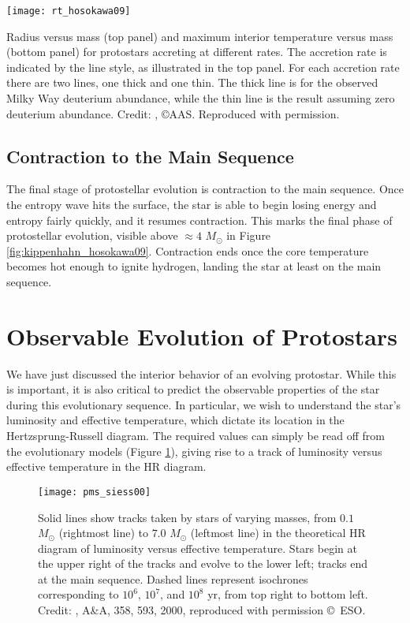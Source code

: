 \begin{marginfigure}
\texttt{[image: rt\_hosokawa09]}
\caption[Protostellar mass-radius relation for different accretion rates]{
\label{fig:rt_hosokawa09}
Radius versus mass (top panel) and maximum interior temperature versus mass (bottom panel) for protostars accreting at different rates. The accretion rate is indicated by the line style, as illustrated in the top panel. For each accretion rate there are two lines, one thick and one thin. The thick line is for the observed Milky Way deuterium abundance, while the thin line is the result assuming zero deuterium abundance.  Credit: \citet{hosokawa09a}, \copyright AAS. Reproduced with permission.
}
\end{marginfigure}

\subsection{Contraction to the Main Sequence}

The final stage of protostellar evolution is contraction to the main sequence. Once the entropy wave hits the surface, the star is able to begin losing energy and entropy fairly quickly, and it resumes contraction. This marks the final phase of protostellar evolution, visible above $\approx 4$ $M_\odot$ in Figure \ref{fig:kippenhahn_hosokawa09}. Contraction ends once the core temperature becomes hot enough to ignite hydrogen, landing the star at least on the main sequence.

\section{Observable Evolution of Protostars}


We have just discussed the interior behavior of an evolving protostar. While this is important, it is also critical to predict the observable properties of the star during this evolutionary sequence. In particular, we wish to understand the star's luminosity and effective temperature, which dictate its location in the Hertzsprung-Russell diagram. The required values can simply be read off from the evolutionary models (Figure \ref{fig:pms_siess00}), giving rise to a track of luminosity versus effective temperature in the HR diagram.

\begin{figure}
\texttt{[image: pms\_siess00]}
\caption[Pre-main sequence evolutionary tracks]{
\label{fig:pms_siess00}
Solid lines show tracks taken by stars of varying masses, from $0.1$ $M_\odot$ (rightmost line) to $7.0$ $M_\odot$ (leftmost line) in the theoretical HR diagram of luminosity versus effective temperature. Stars begin at the upper right of the tracks and evolve to the lower left; tracks end at the main sequence. Dashed lines represent isochrones corresponding to $10^6$, $10^7$, and $10^8$ yr, from top right to bottom left. Credit: \citeauthor{siess00a}, A\&A, 358, 593, 2000, reproduced
with permission \copyright\, ESO.
}
\end{figure}

